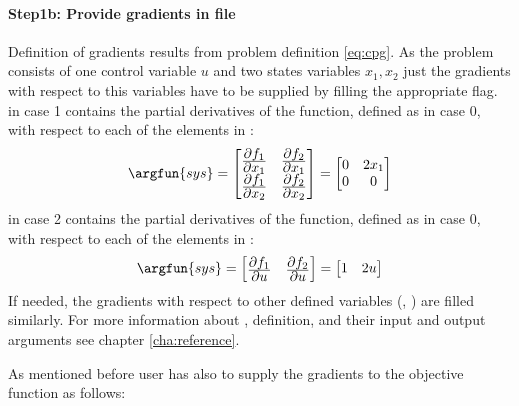 \paragraph{Step1b: Provide gradients in file~}

{\small }

Definition of gradients results from problem definition
\eqref{eq:cpg}. As the problem consists of one control variable $u$
and two states variables $x_{1}, x_{2}$ just the gradients with
respect to this variables have to be supplied by filling the
appropriate flag.\\ 
 in case 1 contains the partial derivatives of the
 function, defined as  in case 0, with
respect to each of the elements in : 
\begin{displaymath}
\argfun{sys} = 
\begin{bmatrix}
\frac{\displaystyle \partial{f_{1}}}{\displaystyle \partial{x_{1}}} &
\frac{\displaystyle \partial{f_{2}}}{\displaystyle \partial{x_{1}}}\\
\frac{\displaystyle \partial{f_{1}}}{\displaystyle \partial{x_{2}}} &
\frac{\displaystyle \partial{f_{2}}}{\displaystyle \partial{x_{2}}}
\end{bmatrix} =
\begin{bmatrix}
0 & 2x_{1}\\
0 & 0
\end{bmatrix}
\end{displaymath}
 in case 2 contains the partial derivatives of the
 function, defined as  in case 0, with
respect to each of the elements in :
\begin{displaymath}
\argfun{sys} = 
\begin{bmatrix}
\frac{\displaystyle \partial{f_{1}}}{\displaystyle \partial{u}} &
\frac{\displaystyle \partial{f_{2}}}{\displaystyle \partial{u}}
\end{bmatrix} =
\begin{bmatrix}
1 & 2u
\end{bmatrix} 
\end{displaymath}
If needed, the gradients with respect to other defined variables
(, ) are filled similarly. For more information
about ,  definition, and their input and
output arguments see chapter \ref{cha:reference}.

As mentioned before user has also to supply the gradients to the
objective function  as follows: 

